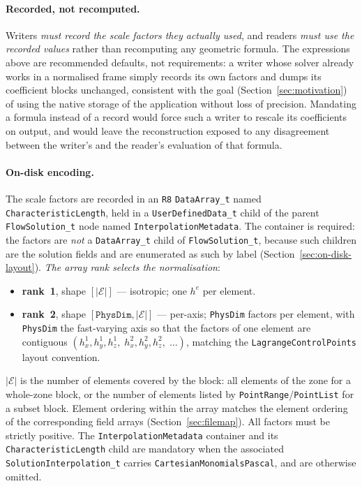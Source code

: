 \documentclass[11pt,letterpaper]{article}
\newif\ifvfourdraft
\newcommand{\vfourmark}{\ifvfourdraft\textcolor{v4violet}{\textbf{[v4]}}\ \fi}
\begin{document}
\paragraph{Recorded, not recomputed.}
Writers \emph{must record the scale factors they actually used}, and readers
\emph{must use the recorded values} rather than recomputing any geometric formula.
The expressions above are recommended defaults, not requirements: a writer whose
solver already works in a normalised frame simply records its own factors and dumps
its coefficient blocks unchanged, consistent with the goal (Section~\ref{sec:motivation})
of using the native storage of the application without loss of precision.  Mandating a
formula instead of a record would force such a writer to rescale its coefficients on
output, and would leave the reconstruction exposed to any disagreement between the
writer's and the reader's evaluation of that formula.

\paragraph{On-disk encoding.}
The scale factors are recorded in an \texttt{R8} \texttt{DataArray\_t} named
\texttt{Charac\-teristic\-Length}, held in a \texttt{UserDefinedData\_t} child of
the parent \texttt{FlowSolution\_t} node named
\texttt{Interpolation\-Metadata}.
\vfourmark The container is required: the factors are \emph{not} a
\texttt{DataArray\_t} child of \texttt{FlowSolution\_t}, because such children are
the solution fields and are enumerated as such by label
(Section~\ref{sec:on-disk-layout}).  \emph{The array rank selects the
normalisation}:

{\sloppy
\begin{itemize}
  \item \textbf{rank~1}, shape $[|\mathcal{E}|]$ --- isotropic; one $h^e$ per element.
  \item \textbf{rank~2}, shape $[\texttt{PhysDim}, |\mathcal{E}|]$ --- per-axis;
    \texttt{PhysDim} factors per element, with \texttt{PhysDim} the fast-varying axis
    so that the factors of one element are contiguous
    $(h^1_x, h^1_y, h^1_z,\; h^2_x, h^2_y, h^2_z,\; \ldots)$, matching the
    \texttt{LagrangeControlPoints} layout convention.
\end{itemize}
\par}

\noindent$|\mathcal{E}|$ is the number of elements covered by the block: all elements of
the zone for a whole-zone block, or the number of elements listed by
\texttt{PointRange}/\texttt{PointList} for a subset block.  Element ordering within the
array matches the element ordering of the corresponding field arrays
(Section~\ref{sec:filemap}).  All factors must be strictly positive.  The
\texttt{InterpolationMetadata} container and its \texttt{CharacteristicLength}
child are mandatory when the associated \texttt{SolutionInterpolation\_t} carries
\texttt{CartesianMonomialsPascal}, and are otherwise omitted.
\end{document}
